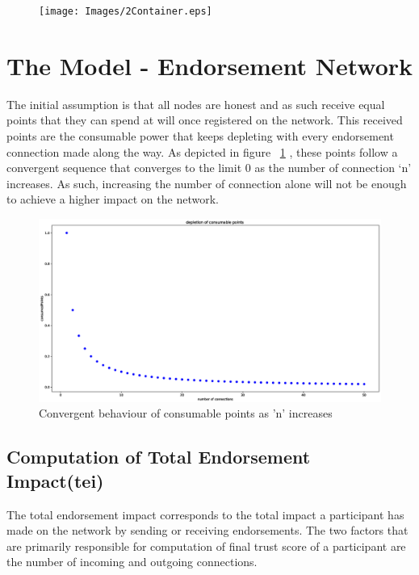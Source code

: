 \begin{figure}
	\texttt{[image: Images/2Container.eps]}
\end{figure}


\section{The Model - Endorsement Network}
The initial assumption is that all nodes are honest and as such receive equal
points that they can spend at will once registered on the network. This received
points are the consumable power that keeps depleting with every endorsement
connection made along the way. As depicted in figure ~\ref{consumablePoint} ,
these points follow a convergent sequence that converges to the limit 0 as the
number of connection `n' increases. As such, increasing the number of
connection alone will not be enough to achieve a higher impact on the network.
\begin{figure}
	\centering
	\includegraphics[width=1.0\textwidth]{Images/ConsumablePoints.eps}
	\caption{Convergent behaviour of consumable points as 'n' increases}
	\label{consumablePoint}
\end{figure}

\subsection{Computation of Total Endorsement Impact(tei)} 
The total endorsement impact corresponds to the total impact a participant has
made on the network by sending or receiving endorsements. The two factors that
are primarily responsible for computation of final trust score of a participant
are the number of incoming and outgoing connections. \\

